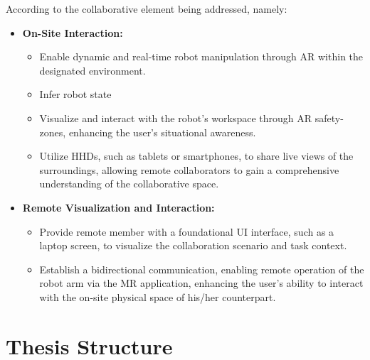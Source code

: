 According to the collaborative element being addressed, namely: 
\begin{itemize}
    \item \textbf{On-Site Interaction:}
    \begin{itemize}
        \item Enable dynamic and real-time robot manipulation through \ac{AR} within the designated environment.
        \item Infer robot state
        \item Visualize and interact with the robot's workspace through \ac{AR} safety-zones, enhancing the user's situational awareness.
        \item Utilize \ac{HHDs}, such as tablets or smartphones, to share live views of the surroundings, allowing remote collaborators 
        to gain a comprehensive understanding of the collaborative space.
    \end{itemize}
    \item \textbf{Remote Visualization and Interaction:}
    \begin{itemize}
        \item Provide remote member with a foundational \ac{UI} interface, such as a laptop screen, to visualize the collaboration scenario and 
        task context.
        \item Establish a bidirectional communication, enabling remote operation of the robot arm via the \ac{MR} application, enhancing the user's ability to interact with the on-site physical space of his/her counterpart.
    \end{itemize}
\end{itemize}


\section{Thesis Structure}
% 

